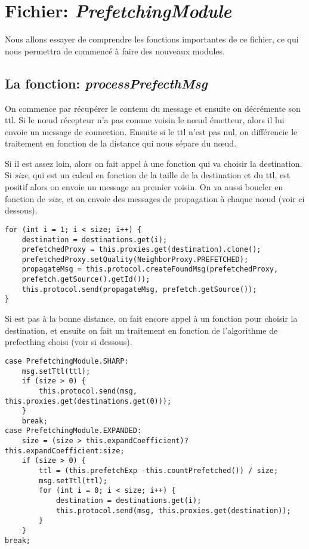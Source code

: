 \documentclass[11pt,a4paper]{article}
\begin{document}
\section{Fichier: \textit{PrefetchingModule}}
Nous allons essayer de comprendre les fonctions importantes de ce fichier, ce qui nous permettra de commencé à faire des nouveaux modules.

\subsection{La fonction: \textit{processPrefecthMsg}}
On commence par récupérer le contenu du message et ensuite on décrémente son ttl. Si le nœud récepteur n'a pas comme voisin le nœud émetteur, alors il lui envoie un message de connection. Ensuite si le ttl n'est pas nul, on différencie le traitement en fonction de la distance qui nous sépare du nœud.
\par Si il est assez loin, alors on fait appel à une fonction qui va choisir la destination. Si \textit{size}, qui est un calcul en fonction de la taille de la destination et du ttl, est positif alors on envoie un message au premier voisin. On va aussi boucler en fonction de \textit{size}, et on envoie des messages de propagation à chaque nœud (voir ci dessous).
\begin{verbatim}
for (int i = 1; i < size; i++) {
    destination = destinations.get(i);
    prefetchedProxy = this.proxies.get(destination).clone();
    prefetchedProxy.setQuality(NeighborProxy.PREFETCHED);
    propagateMsg = this.protocol.createFoundMsg(prefetchedProxy, 
    prefetch.getSource().getId());
    this.protocol.send(propagateMsg, prefetch.getSource());
}	
\end{verbatim}
\par Si est pas à la bonne distance, on fait encore appel à un fonction pour choisir la destination, et ensuite on fait un traitement en fonction de l'algorithme de prefecthing choisi (voir si dessous).
\begin{verbatim}
case PrefetchingModule.SHARP:
    msg.setTtl(ttl);
    if (size > 0) {
        this.protocol.send(msg, this.proxies.get(destinations.get(0)));	
    }
    break;
case PrefetchingModule.EXPANDED:
    size = (size > this.expandCoefficient)?this.expandCoefficient:size;
    if (size > 0) {
        ttl = (this.prefetchExp -this.countPrefetched()) / size;
        msg.setTtl(ttl);
        for (int i = 0; i < size; i++) {
            destination = destinations.get(i);
            this.protocol.send(msg, this.proxies.get(destination));	
        }
    }
break;
\end{verbatim}
\end{document}
